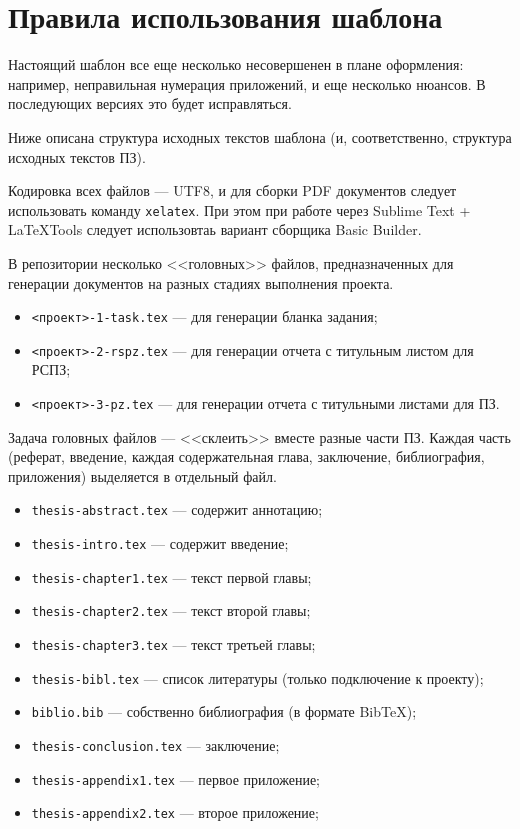 ﻿\chapter{Правила использования шаблона}\label{app-manual}

Настоящий шаблон все еще несколько несовершенен в плане оформления: например, неправильная нумерация приложений, и еще несколько нюансов. В последующих версиях это будет исправляться.

Ниже описана структура исходных текстов шаблона (и, соответственно, структура исходных текстов ПЗ).

Кодировка всех файлов — UTF8, и для сборки PDF документов следует использовать
команду \texttt{xelatex}. При этом при работе через Sublime Text + LaTeXTools
следует использовтаь вариант сборщика Basic Builder.

В репозитории несколько <<головных>> файлов, предназначенных для генерации
документов на разных стадиях выполнения проекта.
\begin{itemize}
  \item[] \texttt{<проект>-1-task.tex} --- для генерации бланка задания;
  \item[] \texttt{<проект>-2-rspz.tex} --- для генерации отчета с титульным
  листом для РСПЗ;
  \item[] \texttt{<проект>-3-pz.tex} --- для генерации отчета с титульными
  листами для ПЗ.
\end{itemize}

Задача головных файлов --- <<склеить>> вместе разные части ПЗ. Каждая часть (реферат, введение, каждая содержательная глава, заключение, библиография, приложения) выделяется в отдельный файл. 

\begin{itemize}
  \item[] \texttt{thesis-abstract.tex} --- содержит аннотацию;
  \item[] \texttt{thesis-intro.tex} --- содержит введение;
  \item[] \texttt{thesis-chapter1.tex} --- текст первой главы;
  \item[] \texttt{thesis-chapter2.tex} --- текст второй главы;
  \item[] \texttt{thesis-chapter3.tex} --- текст третьей главы;
  \item[] \texttt{thesis-bibl.tex} --- список литературы (только подключение к
  проекту);
  \item[] \texttt{biblio.bib} --- собственно библиография (в формате BibTeX);
  \item[] \texttt{thesis-conclusion.tex} --- заключение;
  \item[] \texttt{thesis-appendix1.tex} --- первое приложение;
  \item[] \texttt{thesis-appendix2.tex} --- второе приложение;
\end{itemize}

